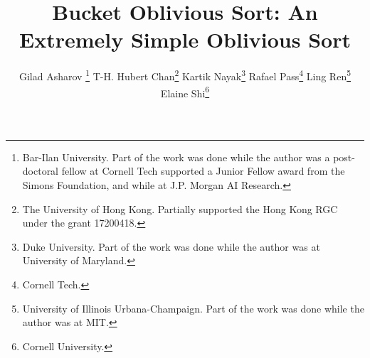 \documentclass[twoside,leqno,twocolumn]{article}
\begin{document}
\title{Bucket Oblivious Sort: An Extremely Simple Oblivious Sort}

\author{Gilad Asharov \thanks{Bar-Ilan University. Part of the work was done while the author was a post-doctoral fellow at Cornell Tech supported a Junior Fellow award from the Simons Foundation, and while at J.P. Morgan AI Research.} \quad
T-H. Hubert Chan\thanks{The University of Hong Kong. Partially supported the Hong Kong RGC under the grant 17200418.} \quad
Kartik Nayak\thanks{Duke University. Part of the work was done while the author was at University of Maryland.} \quad
Rafael Pass\thanks{Cornell Tech.} \quad
Ling Ren\thanks{University of Illinois Urbana-Champaign. Part of the work was done while the author was at MIT.} \quad
Elaine Shi\thanks{Cornell University.}}

\newcommand{\rl}[1]{{\footnotesize\color{orange}[Ling: #1]}}

\date{}

\maketitle


\begin{abstract}

\end{abstract}





{
\small


}
\end{document}

